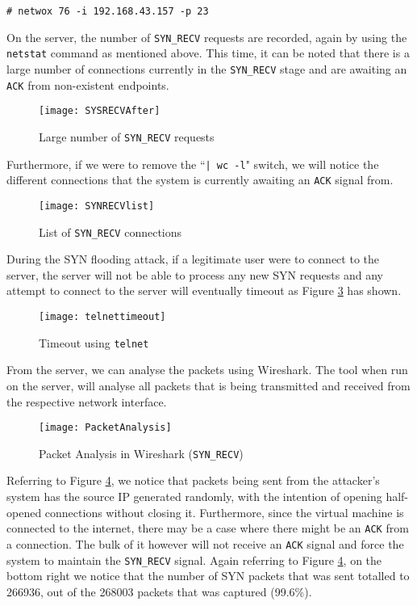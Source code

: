 \documentclass[a4paper,12pt]{article}
\begin{document}
\begin{verbatim}
# netwox 76 -i 192.168.43.157 -p 23
\end{verbatim}
On the server, the number of \texttt{SYN\_RECV} requests are recorded, again by using the \texttt{netstat} command as mentioned above. This time, it can be noted that there is a large number of connections currently in the \texttt{SYN\_RECV} stage and are awaiting an \texttt{ACK} from non-existent endpoints.
\begin{figure}[H]
	\centering
	\texttt{[image: SYSRECVAfter]}
	\caption{Large number of \texttt{SYN\_RECV} requests}
	\label{fig:sysrecvafter}
\end{figure}
\noindent Furthermore, if we were to remove the ``\texttt{| wc -l}" switch, we will notice the different connections that the system is currently awaiting an \texttt{ACK} signal from.
\begin{figure}[H]
	\centering
	\texttt{[image: SYNRECVlist]}
	\caption{List of \texttt{SYN\_RECV} connections}
	\label{fig:synrecvlist}
\end{figure}
\noindent During the SYN flooding attack, if a legitimate user were to connect to the server, the server will not be able to process any new SYN requests and any attempt to connect to the server will eventually timeout as Figure \ref{fig:telnettimeout} has shown.
\begin{figure}[H]
	\centering
	\texttt{[image: telnettimeout]}
	\caption{Timeout using \texttt{telnet}}
	\label{fig:telnettimeout}
\end{figure}
\noindent From the server, we can analyse the packets using Wireshark. The tool when run on the server, will analyse all packets that is being transmitted and received from the respective network interface.
\begin{figure}[H]
	\centering
	\texttt{[image: PacketAnalysis]}
	\caption{Packet Analysis in Wireshark (\texttt{SYN\_RECV})}
	\label{fig:packetanalysis}
\end{figure}
\noindent Referring to Figure \ref{fig:packetanalysis}, we notice that packets being sent from the attacker's system has the source IP generated randomly, with the intention of opening half-opened connections without closing it. Furthermore, since the virtual machine is connected to the internet, there may be a case where there might be an \texttt{ACK} from a connection. The bulk of it however will not receive an \texttt{ACK} signal and force the system to maintain the \texttt{SYN\_RECV} signal. Again referring to Figure  \ref{fig:packetanalysis}, on the bottom right we notice that the number of SYN packets that was sent totalled to 266936, out of the 268003 packets that was captured (99.6\%). 
\end{document}
